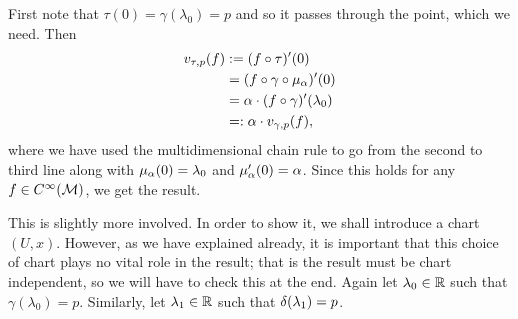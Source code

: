 \documentclass[12pt]{article} %
\begin{document}
        First note that $\tau(0) = \gamma(\lambda_0) =p$ and so it passes through the point, which we need. Then 
        \begin{align*} 
            \begin{split}
                v_{\tau,p}(f)& := (f\circ \tau)'(0) \\
                & = (f\circ \gamma\circ \mu_{\alpha})'(0) \\
                & = \alpha \cdot (f\circ\gamma)'(\lambda_0) \\
                & =: \alpha \cdot v_{\gamma,p}(f),
            \end{split}
        \end{align*} 
        where we have used the multidimensional chain rule to go from the second to third line along with $\mu_{\alpha}(0)=\lambda_0$ and $\mu_{\alpha}'(0)=\alpha$. Since this holds for any $f\in C^{\infty}(\mathcal{M})$, we get the result. 
        \item This is slightly more involved. In order to show it, we shall introduce a chart $(U,x)$. However, as we have explained already, it is important that this choice of chart plays no vital role in the result; that is the result must be chart independent, so we will have to check this at the end. Again let $\lambda_0\in\mathbb{R}$ such that $\gamma(\lambda_0)=p$. Similarly, let $\lambda_1\in\mathbb{R}$ such that $\delta(\lambda_1)=p$.
        
        
        
\end{document}
